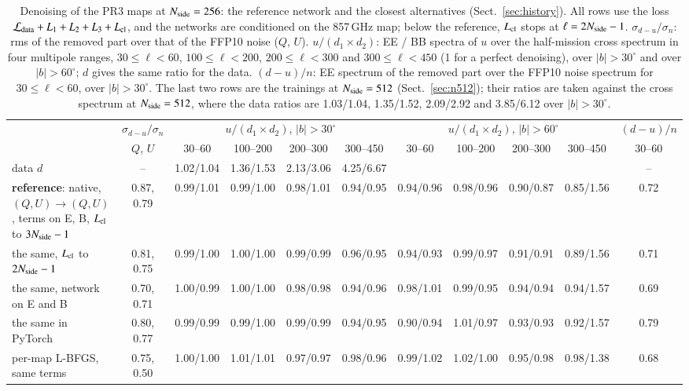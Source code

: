 \documentclass{aa}
\newcommand{\nside}{N_{\rm side}}
\begin{document}
\begin{table}
  \caption{Denoising of the PR3 maps at $\nside=256$: the reference network and the closest alternatives (Sect.~\ref{sec:history}). All rows use the loss $\mathcal{L}_{\rm data}+L_1+L_2+L_3+L_{\rm cl}$, and the networks are conditioned on the 857\,GHz map; below the reference, $L_{\rm cl}$ stops at $\ell=2\nside-1$. $\sigma_{d-u}/\sigma_n$: rms of the removed part over that of the FFP10 noise ($Q$, $U$). $u/(d_1\times d_2)$: EE / BB spectra of $u$ over the half-mission cross spectrum in four multipole ranges, $30\le\ell<60$, $100\le\ell<200$, $200\le\ell<300$ and $300\le\ell<450$ (1 for a perfect denoising), over $|b|>30^\circ$ and over $|b|>60^\circ$; $d$ gives the same ratio for the data. $(d-u)/n$: EE spectrum of the removed part over the FFP10 noise spectrum for $30\le\ell<60$, over $|b|>30^\circ$. The last two rows are the trainings at $\nside=512$ (Sect.~\ref{sec:n512}); their ratios are taken against the cross spectrum at $\nside=512$, where the data ratios are 1.03/1.04, 1.35/1.52, 2.09/2.92 and 3.85/6.12 over $|b|>30^\circ$.}
  \label{tab:real}
  \centering
  \scriptsize
  \setlength{\tabcolsep}{2.5pt}
  \begin{tabular}{p{4.2cm}cccccccccc}
    \hline\hline
    & $\sigma_{d-u}/\sigma_n$ & \multicolumn{4}{c}{$u/(d_1\times d_2)$, $|b|>30^\circ$} & \multicolumn{4}{c}{$u/(d_1\times d_2)$, $|b|>60^\circ$} & $(d-u)/n$ \\
    & $Q$, $U$ & 30--60 & 100--200 & 200--300 & 300--450 & 30--60 & 100--200 & 200--300 & 300--450 & 30--60 \\
    \hline
    data $d$ & -- & 1.02/1.04 & 1.36/1.53 & 2.13/3.06 & 4.25/6.67 & & & & & -- \\
    \textbf{reference}: native, $(Q,U)\to(Q,U)$, terms on E, B, $L_{\rm cl}$ to $3\nside-1$ & 0.87, 0.79 & 0.99/1.01 & 0.99/1.00 & 0.98/1.01 & 0.94/0.95 & 0.94/0.96 & 0.98/0.96 & 0.90/0.87 & 0.85/1.56 & 0.72 \\
    the same, $L_{\rm cl}$ to $2\nside-1$ & 0.81, 0.75 & 0.99/1.00 & 1.00/1.00 & 0.99/0.99 & 0.96/0.95 & 0.94/0.93 & 0.99/0.97 & 0.91/0.91 & 0.89/1.56 & 0.71 \\
    the same, network on E and B & 0.70, 0.71 & 1.00/0.99 & 1.00/1.00 & 0.98/0.98 & 0.94/0.96 & 0.98/1.01 & 0.99/0.95 & 0.94/0.94 & 0.94/1.57 & 0.69 \\
    the same in PyTorch & 0.80, 0.77 & 0.99/0.99 & 0.99/1.00 & 0.99/0.99 & 0.94/0.95 & 0.90/0.94 & 1.01/0.97 & 0.93/0.93 & 0.92/1.57 & 0.79 \\
    per-map L-BFGS, same terms & 0.75, 0.50 & 1.00/1.00 & 1.01/1.01 & 0.97/0.97 & 0.98/0.96 & 0.99/1.02 & 1.02/1.00 & 0.95/0.98 & 0.98/1.38 & 0.68 \\

\end{tabular}
\end{table}
\end{document}
